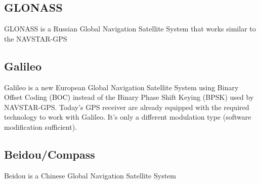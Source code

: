\subsection{GLONASS}
	GLONASS is a Russian Global Navigation Satellite System that works similar to the NAVSTAR-GPS
\subsection{Galileo}
	Galileo is a new European Global Navigation Satellite System using Binary Offset Coding (BOC) instead of the Binary Phase Shift Keying (BPSK) 
	used by NAVSTAR-GPS. Today's GPS receiver are already equipped with the required technology to work with Galileo. It's only a 
	different modulation type (software modification sufficient).
\subsection{Beidou/Compass}
	Beidou is a Chinese Global Navigation Satellite System